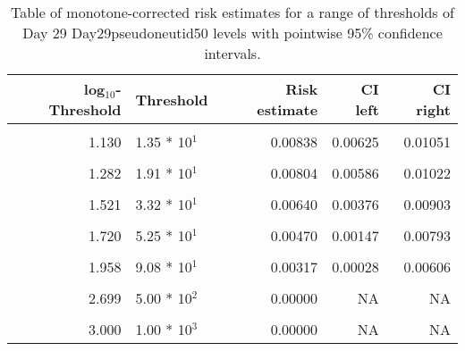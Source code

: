 \documentclass[]{article}
\begin{document}
\begin{table}[!h]

\caption{\label{tab:unnamed-chunk-32}Table of monotone-corrected risk estimates for a range of thresholds of Day 29 Day29pseudoneutid50 levels with pointwise 95\% confidence intervals.}
\centering
\begin{tabular}[t]{rlrrr}
\toprule
log$_{10}$-Threshold & Threshold & Risk estimate & CI left & CI right\\
\midrule
\cellcolor{gray!6}{0.083} & \cellcolor{gray!6}{1.21 * 10$^{0}$} & \cellcolor{gray!6}{0.00875} & \cellcolor{gray!6}{0.00673} & \cellcolor{gray!6}{0.01077}\\
1.130 & 1.35 * 10$^{1}$ & 0.00838 & 0.00625 & 0.01051\\
\cellcolor{gray!6}{1.204} & \cellcolor{gray!6}{1.60 * 10$^{1}$} & \cellcolor{gray!6}{0.00838} & \cellcolor{gray!6}{0.00622} & \cellcolor{gray!6}{0.01054}\\
1.282 & 1.91 * 10$^{1}$ & 0.00804 & 0.00586 & 0.01022\\
\cellcolor{gray!6}{1.423} & \cellcolor{gray!6}{2.65 * 10$^{1}$} & \cellcolor{gray!6}{0.00678} & \cellcolor{gray!6}{0.00460} & \cellcolor{gray!6}{0.00897}\\
1.521 & 3.32 * 10$^{1}$ & 0.00640 & 0.00376 & 0.00903\\
\cellcolor{gray!6}{1.613} & \cellcolor{gray!6}{4.10 * 10$^{1}$} & \cellcolor{gray!6}{0.00579} & \cellcolor{gray!6}{0.00277} & \cellcolor{gray!6}{0.00881}\\
1.720 & 5.25 * 10$^{1}$ & 0.00470 & 0.00147 & 0.00793\\
\cellcolor{gray!6}{1.891} & \cellcolor{gray!6}{7.78 * 10$^{1}$} & \cellcolor{gray!6}{0.00403} & \cellcolor{gray!6}{0.00043} & \cellcolor{gray!6}{0.00763}\\
1.958 & 9.08 * 10$^{1}$ & 0.00317 & 0.00028 & 0.00606\\
\cellcolor{gray!6}{2.047} & \cellcolor{gray!6}{1.11 * 10$^{2}$} & \cellcolor{gray!6}{0.00287} & \cellcolor{gray!6}{0.00061} & \cellcolor{gray!6}{0.00513}\\
2.699 & 5.00 * 10$^{2}$ & 0.00000 & NA & NA\\
\cellcolor{gray!6}{2.828} & \cellcolor{gray!6}{6.73 * 10$^{2}$} & \cellcolor{gray!6}{0.00000} & \cellcolor{gray!6}{NA} & \cellcolor{gray!6}{NA}\\
3.000 & 1.00 * 10$^{3}$ & 0.00000 & NA & NA\\
\bottomrule
\end{tabular}
\end{table}
\end{document}
